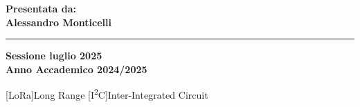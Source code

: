 \documentclass[12pt,a4paper,twoside]{book}
\begin{document}
\begin{titlepage}
\begin{minipage}[t]{0.40\textwidth}
        \vspace{3mm}

    \end{minipage}
    \hfill
    \begin{minipage}[t]{0.40\textwidth}\raggedleft
        {\Large{\bf Presentata da: \\ Alessandro Monticelli}}
    \end{minipage}

    \vspace{30mm}

    \rule[0.5cm]{\textwidth}{0.6mm}
    \fi

    \begin{center}
        {\large{\bf Sessione luglio 2025 \\}}
        {\large{\bf Anno Accademico 2024/2025\\}}
    \end{center}

\end{titlepage}

[LoRa\textsuperscript{\textcopyright}]{Long Range}
[I\textsuperscript{2}C]{Inter-Integrated Circuit}
\restoregeometry
\newpage



\end{document}

